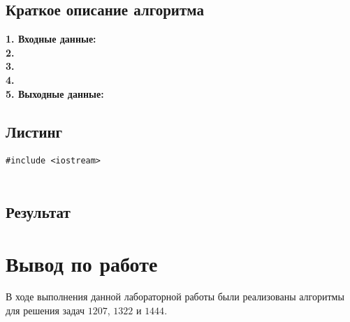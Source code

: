 \documentclass[a5paper, 10pt]{article}
\theoremstyle{definition}
\theoremstyle{plain}
\theoremstyle{remark}
\begin{document}
\subsection{Краткое описание алгоритма}
\textbf{1. Входные данные:} \\
\textbf{2.} \\
\textbf{3.} \\
\textbf{4.} \\
\textbf{5. Выходные данные:} 

\subsection{Листинг}

\begin{center}
\begin{lstlisting}[label=some-code,caption={Исходный код для 1444}]
#include <iostream>


\end{lstlisting}
\end{center}

\subsection{Результат}


\newpage



\newpage
\section{Вывод по работе}
В ходе выполнения данной лабораторной работы были реализованы алгоритмы для решения задач $1207$, $1322$ и $1444$. 
\end{document}
